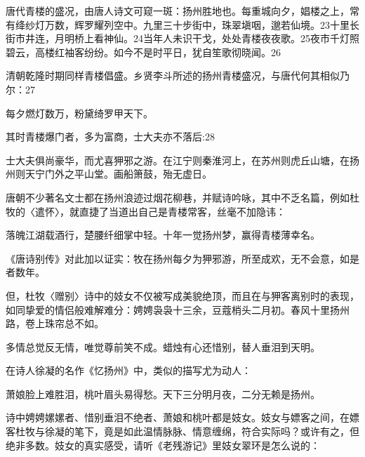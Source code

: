 \noindent 唐代青楼的盛况，由唐人诗文可窥一斑：扬州胜地也。每重城向夕，娼楼之上，常有绛纱灯万数，辉罗耀列空中。九里三十步街中，珠翠塡咽，邈若仙境。23十里长街市井连，月明桥上看神仙。24当年人未识干戈，处处青楼夜夜歌。25夜市千灯照碧云，高楼红袖客纷纷。如今不是时平日，犹自笙歌彻晓闻。26

清朝乾隆时期同样青楼倡盛。乡贤李斗所述的扬州青楼盛况，与唐代何其相似乃尔：27

每夕燃灯数万，粉黛绮罗甲天下。

其时青楼爆门者，多为富商，士大夫亦不落后:28

士大夫俱尚豪华，而尤喜狎邪之游。在江宁则秦淮河上，在苏州则虎丘山塘，在扬州则天宁门外之平山堂。画船箫鼓，殆无虚日。

唐朝不少著名文士都在扬州浪迹过烟花柳巷，并赋诗吟咏，其中不乏名篇，例如杜牧的〈遣怀〉，就直捷了当道出自己是青楼常客，丝毫不加隐讳：

落魄江湖载酒行，楚腰纤细掌中轻。十年一觉扬州梦，赢得青楼薄幸名。

《唐诗别传》对此加以证实：牧在扬州每夕为狎邪游，所至成欢，无不会意，如是者数年。

但，杜牧〈赠别〉诗中的妓女不仅被写成美貌绝顶，而且在与狎客离别时的表现，如同挚爱的情侣般难解难分：娉娉袅袅十三余，豆蔻梢头二月初。春风十里扬州路，卷上珠帘总不如。

\vfill
\begin{BookNotes}
\end{BookNotes}

\begin{BookQuote}
多情总觉反无情，唯觉尊前笑不成。蜡烛有心还惜别，替人垂泪到天明。
\end{BookQuote}

在诗人徐凝的名作《忆扬州》中，类似的描写尤为动人：

\begin{BookQuote}
萧娘脸上难胜泪，桃叶眉头易得愁。天下三分明月夜，二分无赖是扬州。
\end{BookQuote}

诗中娉娉嫘嫘者、惜别垂泪不绝者、萧娘和桃叶都是妓女。妓女与嫖客之间，在嫖客杜牧与徐凝的笔下，竟是如此温情脉脉、情意缠绵，符合实际吗？或许有之，但绝非多数。妓女的真实感受，请听《老残游记》里妓女翠环是怎么说的：

